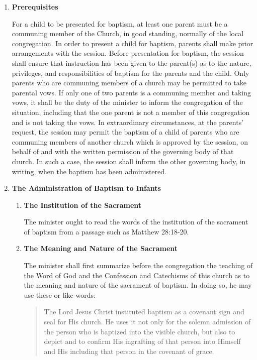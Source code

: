 \documentclass[
]{book}
\begin{document}
\protect\hypertarget{chapter-slug-58-the-baptism-of-infants}{\href{}{}}

\begin{enumerate}
\def\labelenumi{\arabic{enumi}.}
\item
  \protect\hypertarget{58}{\href{}{}}\textbf{Prerequisites}

  For a child to be presented for baptism, at least one parent must be a communing member of the Church, in good standing, normally of the local congregation. In order to present a child for baptism, parents shall make prior arrangements with the session. Before presentation for baptism, the session shall ensure that instruction has been given to the parent(s) as to the nature, privileges, and responsibilities of baptism for the parents and the child. Only parents who are communing members of a church may be permitted to take parental vows. If only one of two parents is a communing member and taking vows, it shall be the duty of the minister to inform the congregation of the situation, including that the one parent is not a member of this congregation and is not taking the vows. In extraordinary circumstances, at the parents' request, the session may permit the baptism of a child of parents who are communing members of another church which is approved by the session, on behalf of and with the written permission of the governing body of that church. In such a case, the session shall inform the other governing body, in writing, when the baptism has been administered.
\item
  \textbf{The Administration of Baptism to Infants}

  \begin{enumerate}
  \def\labelenumii{\alph{enumii}.}
  \item
    \textbf{The Institution of the Sacrament}

    The minister ought to read the words of the institution of the sacrament of baptism from a passage such as Matthew 28:18-20.
  \item
    \textbf{The Meaning and Nature of the Sacrament}

    The minister shall first summarize before the congregation the teaching of the Word of God and the Confession and Catechisms of this church as to the meaning and nature of the sacrament of baptism. In doing so, he may use these or like words:

    \begin{quote}
    The Lord Jesus Christ instituted baptism as a covenant sign and seal for His church. He uses it not only for the solemn admission of the person who is baptized into the visible church, but also to depict and to confirm His ingrafting of that person into Himself and His including that person in the covenant of grace.


\end{quote}
\end{enumerate}
\end{enumerate}
\end{document}
